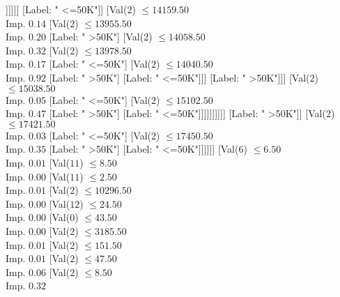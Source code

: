 \documentclass[margin=10pt]{standalone}
\begin{document}
\begin{forest}
																					[Label: " <=50K"]
																					[Val($2$) $ \leq 12223.50$ \\ Imp. $0.28$
																						[Label: " >50K"]
																						[Val($2$) $ \leq 12356.50$ \\ Imp. $0.29$
																							[Label: " <=50K"]
																							[Label: " >50K"]]]]]]
																		[Label: " <=50K"]]
																	[Val($2$) $ \leq 14159.50$ \\ Imp. $0.14$
																		[Val($2$) $ \leq 13955.50$ \\ Imp. $0.20$
																			[Label: " >50K"]
																			[Val($2$) $ \leq 14058.50$ \\ Imp. $0.32$
																				[Val($2$) $ \leq 13978.50$ \\ Imp. $0.17$
																					[Label: " <=50K"]
																					[Val($2$) $ \leq 14040.50$ \\ Imp. $0.92$
																						[Label: " >50K"]
																						[Label: " <=50K"]]]
																				[Label: " >50K"]]]
																		[Val($2$) $ \leq 15038.50$ \\ Imp. $0.05$
																			[Label: " <=50K"]
																			[Val($2$) $ \leq 15102.50$ \\ Imp. $0.47$
																				[Label: " >50K"]
																				[Label: " <=50K"]]]]]]]]]]
											[Label: " >50K"]]
										[Val($2$) $ \leq 17421.50$ \\ Imp. $0.03$
											[Label: " <=50K"]
											[Val($2$) $ \leq 17450.50$ \\ Imp. $0.35$
												[Label: " >50K"]
												[Label: " <=50K"]]]]]]
							[Val($6$) $ \leq 6.50$ \\ Imp. $0.01$
								[Val($11$) $ \leq 8.50$ \\ Imp. $0.00$
									[Val($11$) $ \leq 2.50$ \\ Imp. $0.01$
										[Val($2$) $ \leq 10296.50$ \\ Imp. $0.00$
											[Val($12$) $ \leq 24.50$ \\ Imp. $0.00$
												[Val($0$) $ \leq 43.50$ \\ Imp. $0.00$
													[Val($2$) $ \leq 3185.50$ \\ Imp. $0.01$
														[Val($2$) $ \leq 151.50$ \\ Imp. $0.01$
															[Val($2$) $ \leq 47.50$ \\ Imp. $0.06$
																[Val($2$) $ \leq 8.50$ \\ Imp. $0.32$

\end{forest}
\end{document}
